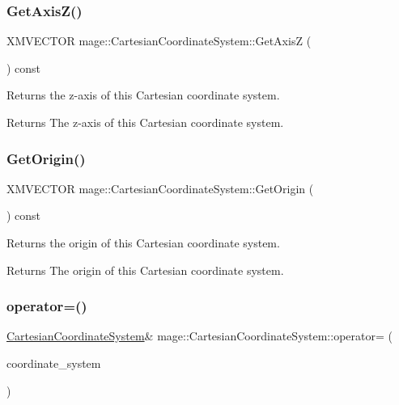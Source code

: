 \subsubsection{\texorpdfstring{Get\+Axis\+Z()}{GetAxisZ()}}
{\footnotesize\ttfamily X\+M\+V\+E\+C\+T\+OR mage\+::\+Cartesian\+Coordinate\+System\+::\+Get\+AxisZ (\begin{DoxyParamCaption}{ }\end{DoxyParamCaption}) const}

Returns the z-\/axis of this Cartesian coordinate system.

\begin{DoxyReturn}{Returns}
The z-\/axis of this Cartesian coordinate system. 
\end{DoxyReturn}
\hypertarget{structmage_1_1_cartesian_coordinate_system_ac413d8f94f94102faa47d7c5cf8813b9}{}\label{structmage_1_1_cartesian_coordinate_system_ac413d8f94f94102faa47d7c5cf8813b9} 
\subsubsection{\texorpdfstring{Get\+Origin()}{GetOrigin()}}
{\footnotesize\ttfamily X\+M\+V\+E\+C\+T\+OR mage\+::\+Cartesian\+Coordinate\+System\+::\+Get\+Origin (\begin{DoxyParamCaption}{ }\end{DoxyParamCaption}) const}

Returns the origin of this Cartesian coordinate system.

\begin{DoxyReturn}{Returns}
The origin of this Cartesian coordinate system. 
\end{DoxyReturn}
\hypertarget{structmage_1_1_cartesian_coordinate_system_acf9dab4edc5c07b5bbf6bee0bdfe317c}{}\label{structmage_1_1_cartesian_coordinate_system_acf9dab4edc5c07b5bbf6bee0bdfe317c} 
\subsubsection{\texorpdfstring{operator=()}{operator=()}\hspace{0.1cm}{\footnotesize\ttfamily [1/2]}}
{\footnotesize\ttfamily \hyperlink{structmage_1_1_cartesian_coordinate_system}{Cartesian\+Coordinate\+System}\& mage\+::\+Cartesian\+Coordinate\+System\+::operator= (\begin{DoxyParamCaption}\item[{const \hyperlink{structmage_1_1_cartesian_coordinate_system}{Cartesian\+Coordinate\+System} \&}]{coordinate\+\_\+system }\end{DoxyParamCaption})\hspace{0.3cm}{\ttfamily [default]}}


